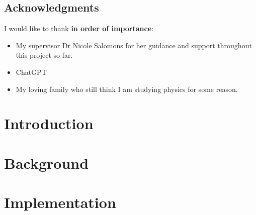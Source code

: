 \documentclass[12pt,twoside]{report}
\begin{document}



\clearpage{\pagestyle{empty}\cleardoublepage}
\setcounter{page}{1}
\pagestyle{fancy}


\section*{Acknowledgments}
I would like to thank \textbf{in order of importance}:
\begin{itemize}[noitemsep]
    \item My supervisor Dr Nicole Salomons for her guidance and support throughout this project so far.
    \item ChatGPT
    \item My loving family who still think I am studying physics for some reason.
\end{itemize}
\clearpage{\pagestyle{empty}\clearpage}

\tableofcontents


\clearpage{\pagestyle{empty}\clearpage}
\setcounter{page}{1}
\fancyhead[LE,RO]{\slshape \rightmark}
\fancyhead[LO,RE]{\slshape \leftmark}

\chapter{Introduction}


\chapter{Background}




\chapter{Implementation}




\end{document}
